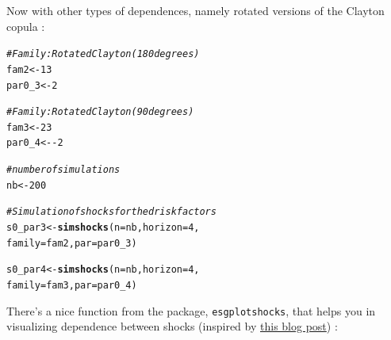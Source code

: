 \documentclass[a4paper]{article}\usepackage[]{graphicx}\usepackage[]{color}
\makeatletter
\newcommand{\hlnum}[1]{\textcolor[rgb]{0.686,0.059,0.569}{#1}}%
\newcommand{\hlcom}[1]{\textcolor[rgb]{0.678,0.584,0.686}{\textit{#1}}}%
\newcommand{\hlopt}[1]{\textcolor[rgb]{0,0,0}{#1}}%
\newcommand{\hlstd}[1]{\textcolor[rgb]{0.345,0.345,0.345}{#1}}%
\newcommand{\hlkwb}[1]{\textcolor[rgb]{0.69,0.353,0.396}{#1}}%
\newcommand{\hlkwc}[1]{\textcolor[rgb]{0.333,0.667,0.333}{#1}}%
\newcommand{\hlkwd}[1]{\textcolor[rgb]{0.737,0.353,0.396}{\textbf{#1}}}%
\newenvironment{kframe}{%
 \def\at@end@of@kframe{}%
 \ifinner\ifhmode%
  \def\at@end@of@kframe{\end{minipage}}%
  \begin{minipage}{\columnwidth}%
 \fi\fi%
 \def\FrameCommand##1{\hskip\@totalleftmargin \hskip-\fboxsep
 \colorbox{shadecolor}{##1}\hskip-\fboxsep
     \hskip-\linewidth \hskip-\@totalleftmargin \hskip\columnwidth}%
 \MakeFramed {\advance\hsize-\width
   \@totalleftmargin\z@ \linewidth\hsize
   \@setminipage}}%
 {\par\unskip\endMakeFramed%
 \at@end@of@kframe}
\newenvironment{knitrout}{}{} %
\newcommand{\code}[1]{\mbox{\texttt{#1}}}
\makeatother
\begin{document}
Now with other types of dependences, namely rotated versions of the Clayton copula :

\begin{knitrout}
\color{fgcolor}\begin{kframe}
\begin{alltt}
\hlcom{# Family : Rotated Clayton (180 degrees)}
\hlstd{fam2} \hlkwb{<-} \hlnum{13}
\hlstd{par0_3} \hlkwb{<-} \hlnum{2}

\hlcom{# Family : Rotated Clayton (90 degrees)}
\hlstd{fam3} \hlkwb{<-} \hlnum{23}
\hlstd{par0_4} \hlkwb{<-} \hlopt{-}\hlnum{2}

\hlcom{# number of simulations}
\hlstd{nb} \hlkwb{<-} \hlnum{200}

\hlcom{# Simulation of shocks for the d risk factors}
\hlstd{s0_par3} \hlkwb{<-} \hlkwd{simshocks}\hlstd{(}\hlkwc{n} \hlstd{= nb,} \hlkwc{horizon} \hlstd{=} \hlnum{4}\hlstd{,}
\hlkwc{family} \hlstd{= fam2,} \hlkwc{par} \hlstd{= par0_3)}

\hlstd{s0_par4} \hlkwb{<-} \hlkwd{simshocks}\hlstd{(}\hlkwc{n} \hlstd{= nb,} \hlkwc{horizon} \hlstd{=} \hlnum{4}\hlstd{,}
\hlkwc{family} \hlstd{= fam3,} \hlkwc{par} \hlstd{= par0_4)}
\end{alltt}
\end{kframe}
\end{knitrout}

There's a nice function from the package, \code{esgplotshocks}, that helps you in visualizing  dependence between shocks (inspired by \href{http://rforpublichealth.blogspot.fr/2014/02/ggplot2-cheatsheet-for-visualizing.html}{this blog post}) : 
\end{document}
